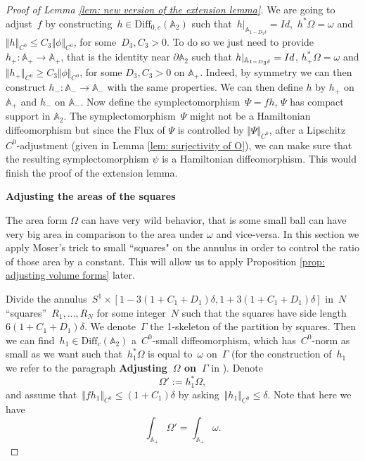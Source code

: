 \documentclass[10pt]{amsart}
\newcommand{\Flux}{\mathrm{Flux}}
\begin{document}
\begin{proof}[Proof of Lemma \ref{lem: new version of the extension lemma}]
We are going to adjust~$f$ by constructing~$h\in \text{Diff}_{0,c}(\mathbb{A}_2)$ such that~$h\vert_{\mathbb{A}_{1-D_3\delta}}=Id$,~$h^*\Omega=\omega$ and~$\Vert h \Vert_{C^0}\leq C_3 \Vert\phi\Vert_{C^0}$, for some~$D_3, C_3>0$. To do so we just need to provide $h_+ \colon \mathbb A_+ \to \mathbb A_+$, that is the identity near $\partial \mathbb A_2$ such that $\smash[t]{h\vert_{\mathbb A_{1-D_3 \delta}}=Id}$, $h_+^*\Omega=\omega$ and $\Vert h_+ \Vert_{C^0}\geq C_3 \Vert \phi \Vert_{C^0}$, for some $D_3, C_3 >0$ on $\mathbb A_+$. Indeed, by symmetry we can then construct $h_- \colon \mathbb A_- \to \mathbb A_-$ with the same properties. We can then define $h$ by $h_+$ on $\mathbb A_+$ and $h_-$ on $\mathbb A_-$. Now define the symplectomorphism~$\Psi=fh$, $\Psi$ has compact support in $\mathbb A_2$. The symplectomorphism~$\Psi$ might not be a Hamiltonian diffeomorphism but since the $\Flux$ of $\Psi$ is controlled by $\Vert \Psi \Vert_{C^0}$, after a Lipschitz~$C^0$-adjustment (given in Lemma \ref{lem: surjectivity of O}), we can make sure that the resulting symplectomorphism $\psi$ is a Hamiltonian diffeomorphism. This would finish the proof of the extension lemma.

\begin{center}
    \textbf{Adjusting the areas of the squares}
\end{center}

The area form $\Omega$ can have very wild behavior, that is some small ball can have very big area in comparison to the area under $\omega$ and vice-versa. In this section we apply Moser's trick to small ``squares" on the annulus in order to control the ratio of those area by a constant. This will allow us to apply Proposition \ref{prop: adjusting volume forms} later.

Divide the annulus~$S^1\times [1-3(1+C_1+D_1)\delta, 1+3(1+C_1+D_1)\delta]$ in~$N$ ``squares''~$R_1,\ldots, R_N$ for some integer~$N$ such that the squares have side length~$6(1+C_1+D_1)\delta$. We denote~$\Gamma$ the 1-skeleton of the partition by squares. Then we can find~$h_1\in \text{Diff}_c(\mathbb{A}_2)$ a~$C^0$-small diffeomorphism, which has~$C^0$-norm as small as we want such that~$h_1^*\Omega$ is equal to~$\omega$ on~$\Gamma$ (for the construction of~$h_1$ we refer to the paragraph \textbf{Adjusting~$\Omega$ on~$\Gamma$} in \cite[Section 6.3]{EPP}). Denote
$$\Omega':=h_1^*\Omega,$$
and assume that~$\Vert fh_1 \Vert_{C^0}\leq (1+C_1)\delta$ by asking~$\Vert h_1 \Vert_{C^0}\leq \delta$. Note that here we have
$$\int_{\mathbb{A}_+}\Omega'=\int_{\mathbb{A}_+}\omega.$$


\end{proof}
\end{document}
